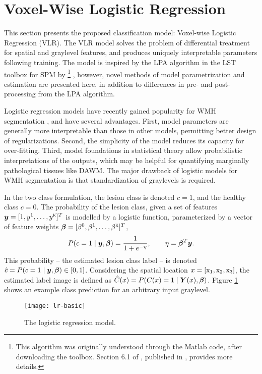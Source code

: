 \section{Voxel-Wise Logistic Regression}\label{s:vlr}
This section presents the proposed classification model: Voxel-wise Logistic Regression (VLR).
The VLR model solves the problem of differential treatment for spatial and graylevel features, and produces uniquely interpretable parameters following training.
The model is inspired by the LPA algorithm in the LST toolbox for SPM by \citeauthor{Schmidt2015} \cite{Schmidt2015,Schmidt2017a}%
\footnote{This algorithm was originally understood through the Matlab code, after downloading the toolbox. Section 6.1 of \cite{Schmidt2017a}, published in \citeyear{Schmidt2017a}, provides more details.}%
, however, novel methods of model parametrization and estimation are presented here, in addition to differences in pre- and post-processing from the LPA algorithm.
\par
Logistic regression models have recently gained popularity for WMH segmentation \cite{Sweeney2013a,Sweeney2013,Schmidt2017a,Zhan2017}, and have several advantages.
First, model parameters are generally more interpretable than those in other models, permitting better design of regularizations.
Second, the simplicity of the model reduces its capacity for over-fitting.
Third, model foundations in statistical theory allow probabilistic interpretations of the outputs, which may be helpful for quantifying marginally pathological tissues like DAWM.
The major drawback of logistic models for WMH segmentation is that standardization of graylevels is required.
\par
In the two class formulation, the lesion class is denoted $c=1$, and the healthy class $c=0$.
The probability of the lesion class, given a set of features $\bm{y} = [1,y^1,\dots,y^{\textsc{k}}]^T$ is modelled by a logistic function, parameterized by a vector of feature weights $\bm{\beta} = [\beta^0,\beta^1,\dots,\beta^{\textsc{k}}]^T$,
\begin{equation}
  P(c=1\mid\bm{y},\bm{\beta}) = \frac{1}{1+e^{-\eta}},\qquad\eta = \bm{\beta}^T\bm{y}.
  \label{eq:lrmodel}
\end{equation}
This probability -- the estimated lesion class label -- is denoted $\hat{c} = P(c=1\mid\bm{y},\bm{\beta}) \in [0,1]$.
Considering the spatial location $x = [\mathrm{x}_1,\mathrm{x}_2,\mathrm{x}_3]$, the estimated label image is defined as $\hat{C}(x) = P(C(x)=1\mid\bm{Y}(x),\bm{\beta})$.
Figure \ref{fig:lr-basic} shows an example class prediction for an arbitrary input graylevel.
\begin{figure}[b]
  \centering\texttt{[image: lr-basic]}
  \caption{The logistic regression model.}
  \label{fig:lr-basic}
\end{figure}
